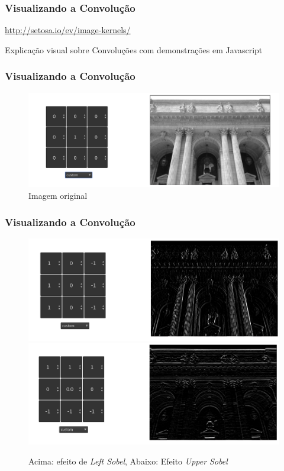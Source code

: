 \documentclass[tikz,10pt]{beamer}
\begin{document}
\begin{frame}
	\frametitle{Visualizando a Convolução}
	\centering
	\par \url{http://setosa.io/ev/image-kernels/}
	\par Explicação visual sobre Convoluções com demonstrações em Javascript
\end{frame}



\begin{frame}
	\frametitle{Visualizando a Convolução}
	\centering
\begin{figure}
	\centering
	\includegraphics[width=1.0\linewidth]{images/convolucao/001_sem_filtro}
	\caption{Imagem original}
	\label{fig:001semfiltro}
\end{figure}

\end{frame}

\begin{frame}
	\frametitle{Visualizando a Convolução}
	\centering
\begin{figure}[t!]
	\centering
	\includegraphics[width=0.7\linewidth]{images/convolucao/004_left_sobel} \\
	\includegraphics[width=0.7\linewidth]{images/convolucao/003_upper_sobel} \\
	\caption{Acima: efeito de \textit{Left Sobel}, Abaixo: Efeito \textit{Upper Sobel}}
	\label{fig:left_upper}
\end{figure}
\end{frame}
\end{document}
